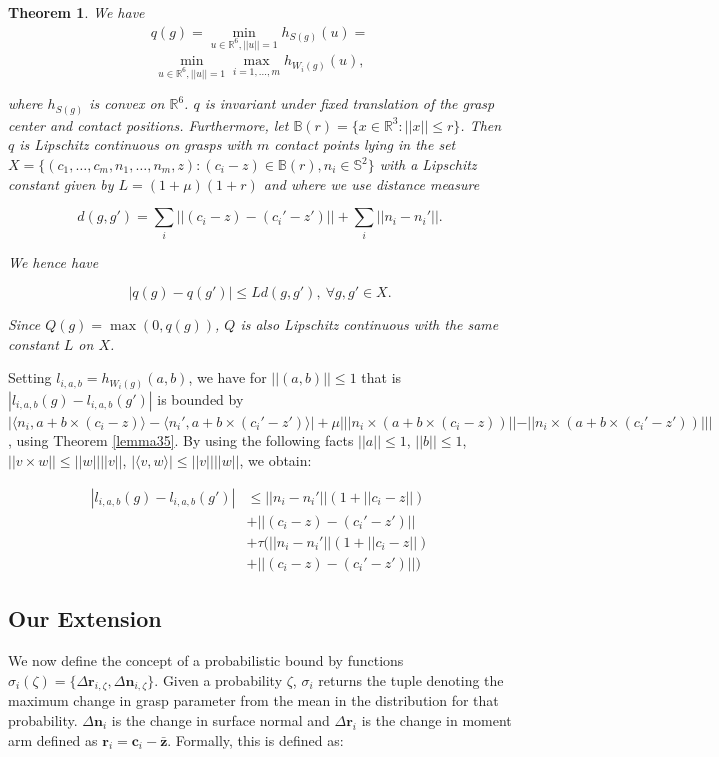 \documentclass[letterpaper, 10 pt, conference]{ieeeconf}  %
\newtheorem{theorem}{Theorem}
\begin{document}
\begin{theorem}
  \cite{pokorny2013classical}
We have \\

\begin{align}
q(g) 
=
\min_{u\in \mathbb{R}^6, ||u|| =1} h_{S(g)}(u) 
=
\end{align}
\[
\min_{u\in \mathbb{R}^6, ||u|| =1} \max_{i=1,...,m} h_{W_i(g)}(u),
\]

where $h_{S(g)}$ is convex on $\mathbb{R}^6$.
$q$ is invariant under fixed translation of the grasp center and contact positions.
Furthermore, let $\mathbb{B}(r) = \lbrace x \in \mathbb{R}^3 : ||x|| \leq r \rbrace$.
Then $q$ is Lipschitz continuous on grasps with $m$ contact points lying in the set $X = \lbrace (c_1, \dots, c_m,n_1, \dots,n_m,z) : (c_i-z) \in \mathbb{B}(r), n_i \in \mathbb{S}^2 \rbrace$ with a Lipschitz constant given by $L= (1+\mu)(1+r)$ and where we use distance measure 

\[
  d(g,g') = \sum_i ||(c_i-z)-(c_i'-z')|| + \sum_i ||n_i - n_i'||.
\]

We hence have 

\[
|q(g) - q(g')| \leq Ld(g,g'),\  \forall g,g' \in X.
\]

Since $Q(g) = \max(0,q(g))$, $Q$ is also Lipschitz continuous with the same constant $L$ on $X$. 
\end{theorem}

Setting $l_{i,a,b} = h_{W_i(g)}(a,b)$, we have for $||(a,b)|| \leq 1$ that is $|l_{i,a,b}(g) - l_{i,a,b}(g')|$ is bounded by $|\langle n_i,a+b\times (c_i-z)\rangle - \langle n_i',a+b\times(c_i'-z')\rangle|+\mu|||n_i \times (a+b \times (c_i -z))|| - ||n_i \times (a + b \times (c_i' - z')) |||$, using Theorem \ref{lemma35}.
By using the following facts $||a|| \leq 1$, $||b|| \leq 1$, $||v \times w || \leq ||w||||v||$, $|\langle v,w\rangle | \leq ||v||||w||$, we obtain:  

\begin{align*}
|l_{i,a,b}(g) - l_{i,a,b}(g')| &\leq ||n_i - n_i'||(1+||c_i - z||) \\
					&+ ||(c_i - z)-(c_i'-z')|| \\
					&+ \tau(||n_i - n_i'||(1+||c_i - z||)\\
					&+||(c_i - z)-(c_i'-z')||)
\end{align*}

\subsection{Our Extension}
We now define the concept of a probabilistic bound by functions $\sigma_i(\zeta) = \lbrace\Delta \textbf{r}_{i,\zeta}, \Delta \textbf{n}_{i,\zeta}\rbrace$. Given a probability $\zeta$, $\sigma_i$ returns the tuple denoting the maximum change in grasp parameter from the mean in the distribution for that probability. $\Delta \textbf{n}_i$ is the change in surface normal and $\Delta \textbf{r}_i$ is the change in moment arm defined as $\textbf{r}_i = \textbf{c}_i - \bar{\textbf{z}}$.
Formally, this is defined as:
\end{document}
